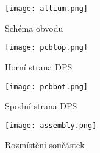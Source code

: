 \begin{figure}[h]
\centering
\texttt{[image: altium.png]}
\caption{Schéma obvodu}
\end{figure}
\begin{figure}[h]
\centering
\texttt{[image: pcbtop.png]}
\caption{Horní strana DPS}
\end{figure}
\begin{figure}[h]
\centering
\texttt{[image: pcbbot.png]}
\caption{Spodní strana DPS}
\end{figure}
\begin{figure}[h]
\centering
\texttt{[image: assembly.png]}
\caption{Rozmístění součástek}
\end{figure}